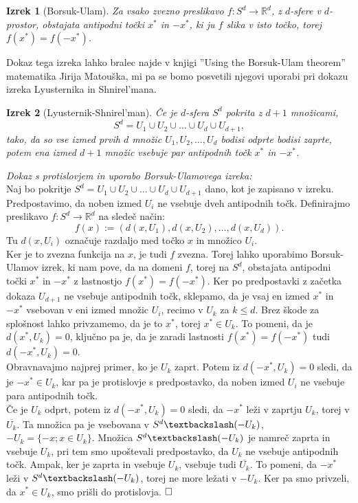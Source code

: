 \documentclass[a4paper,12pt]{article}
\def\qed{$\hfill\Box$}   %
\newtheorem{izrek}{Izrek}
\begin{document}
\begin{izrek}[Borsuk-Ulam]
Za vsako zvezno preslikavo $f:S^d \rightarrow \mathbb{R}^d$, z $d$-sfere v $d$-prostor, obstajata antipodni točki $x^*$ in $-x^*$, ki ju $f$ slika v isto točko, torej $f(x^*)=f(-x^*)$.
\end{izrek}

Dokaz tega izreka lahko bralec najde v knjigi ''Using the Borsuk-Ulam theorem'' matematika Jirija Matouška, mi pa se bomo posvetili njegovi uporabi pri dokazu izreka Lyusternika in Shnirel'mana.

\begin{izrek}[Lyusternik-Shnirel'man]
Če je $d$-sfera $S^d$ pokrita z $d+1$ množicami,
$$S^d = U_1 \cup U_2 \cup \ldots \cup U_d \cup U_{d+1},$$
tako, da so vse izmed prvih $d$ množic $U_1, U_2, \ldots, U_d$ bodisi odprte bodisi zaprte, potem ena izmed $d+1$ množic vsebuje par antipodnih točk $x^*$ in $-x^*$.
\end{izrek}

\noindent
{\em Dokaz s protislovjem in uporabo Borsuk-Ulamovega izreka:} \\
\indent Naj bo pokritje $S^d = U_1 \cup U_2 \cup \ldots \cup U_d \cup U_{d+1}$ dano, kot je zapisano v izreku. Predpostavimo, da noben izmed $U_i$ ne vsebuje dveh antipodnih točk. Definirajmo preslikavo $f:S^d \rightarrow \mathbb{R}^d$ na sledeč način:
$$f(x) := (d(x,U_1), d(x,U_2), \ldots, d(x,U_d)).$$
Tu $d(x,U_i)$ označuje razdaljo med točko $x$ in množico $U_i$. \\
\indent Ker je to zvezna funkcija na $x$, je tudi $f$ zvezna. Torej lahko uporabimo Borsuk-Ulamov izrek, ki nam pove, da na domeni $f$, torej na $S^d$, obstajata antipodni točki $x^*$ in $-x^*$ z lastnostjo $f(x^*)=f(-x^*)$. Ker po predpostavki z začetka dokaza $U_{d+1}$ ne vsebuje antipodnih točk, sklepamo, da je vsaj en izmed $x^*$ in $-x^*$ vsebovan v eni izmed množic $U_i$, recimo v $U_k$ za $k\leq d$. Brez škode za splošnost lahko privzamemo, da je to $x^*$, torej $x^* \in U_k$. To pomeni, da je $d(x^*, U_k) = 0$, ključno pa je, da je zaradi lastnosti $f(x^*)=f(-x^*)$ tudi $d(-x^*, U_k) = 0$.\\
\indent Obravnavajmo najprej primer, ko je $U_k$ zaprt. Potem iz $d(-x^*, U_k) = 0$ sledi, da je $-x^* \in U_k$, kar pa je protislovje s predpostavko, da noben izmed $U_i$ ne vsebuje para antipodnih točk.\\
\indent Če je $U_k$ odprt, potem iz $d(-x^*, U_k) = 0$ sledi, da $-x^*$ leži v zaprtju $U_k$, torej v $\overline {U_k}$. Ta množica pa je vsebovana v $S^d\textbackslash(-U_k)$, \mbox{$-U_k = \{-x;x \in U_k\}$}. Množica $S^d\textbackslash(-U_k)$ je namreč zaprta in vsebuje $U_k$, pri tem smo upoštevali predpostavko, da $U_k$ ne vsebuje antipodnih točk. Ampak, ker je zaprta in vsebuje $U_k$, vsebuje tudi $\overline {U_k}$. To pomeni, da $-x^*$ leži v  $S^d\textbackslash(-U_k)$, torej ne more ležati v $-U_k$. Ker pa smo privzeli, da $x^* \in U_k$, smo prišli do protislovja. \qed
\end{document}
